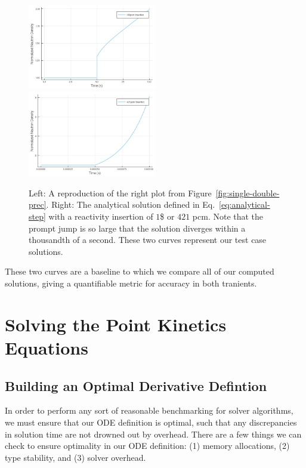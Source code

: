 \documentclass[review,onefignum,onetabnum]{siamart171218}
\begin{document}
\begin{figure}[htb]
  \includegraphics[width=0.5\textwidth]{../plots/analytical-sols/100pcm.png}
  \includegraphics[width=0.5\textwidth]{../plots/analytical-sols/421pcm.png}
  \caption{Left: A reproduction of the right plot from Figure~\cref{fig:single-double-prec}.
  Right: The analytical solution defined in Eq.~\cref{eq:analytical-step} with a
  reactivity insertion of $1$\$ or $421$ pcm. Note that the prompt jump is so large that the
  solution diverges within a thousandth of a second. These two curves represent our
  test case solutions.}
  \label{fig:dollar-insert-analytical}
\end{figure}

These two curves are a baseline to which we compare all of our computed solutions,
giving a quantifiable metric for accuracy in both tranients.

\section{Solving the Point Kinetics Equations}

\subsection{Building an Optimal Derivative Defintion}
In order to perform any sort of reasonable benchmarking for solver algorithms,
we must ensure that our ODE definition is optimal, such that any discrepancies in
solution time are not drowned out by overhead. There are a few things we can check
to ensure optimality in our ODE definition: (1) memory allocations, (2) type stability,
and (3) solver overhead. \\
\end{document}
